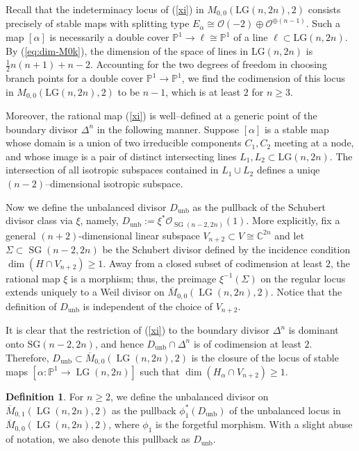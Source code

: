 \documentclass[10pt]{amsart}
\theoremstyle{definition}
\newtheorem{definition}[theorem]{Definition}
\newcommand{\Mbar}{\overline{M}}
\newcommand{\OO}{\mathcal{O}}
\newcommand{\LG}{\operatorname{LG}}
\DeclareMathOperator{\unb}{unb}
\newcommand{\PP}{\mathbb{P}}
\theoremstyle{plain} %
\begin{document}
Recall that the indeterminacy locus of (\ref{xi}) in $M_{0,0}(\mathrm{LG}(n,2n),2)$ consists precisely of stable maps with splitting type $E_\alpha \cong \mathcal{O}(-2) \oplus \mathcal{O}^{\oplus (n-1)}$. Such a map $[\alpha]$ is necessarily a double cover $\mathbb{P}^1 \to \ell \cong \mathbb{P}^1$ of a line $\ell \subset \mathrm{LG}(n,2n)$.
By (\ref{eq:dim-M0k}), the dimension of the space of lines in $\mathrm{LG}(n,2n)$ is $\frac{1}{2}n(n+1)+n-2$. Accounting for the two degrees of freedom in choosing branch points for a double cover $\mathbb{P}^1 \to \mathbb{P}^1$, we find the codimension of this locus in $M_{0,0}(\mathrm{LG}(n,2n),2)$ to be $n-1$, which is at least $2$ for $n \geq 3$.

Moreover, the rational map (\ref{xi}) is well--defined at a generic point of the boundary divisor $\Delta^n$ in the following manner. 
Suppose $[\alpha]$ is a stable map whose domain is a union of two irreducible components $C_1, C_2$ meeting at a node, and whose image is a pair of distinct intersecting lines $L_1, L_2 \subset \mathrm{LG}(n,2n)$.
The intersection of all isotropic subspaces contained in $L_1 \cup L_2$ defines a uniqe $(n-2)$--dimensional isotropic subspace. 

Now we define the unbalanced divisor \(D_{\mathrm{unb}}\) as the pullback of the Schubert divisor class via \(\xi\), namely,
$D_{\mathrm{unb}} := \xi^* \OO_{\operatorname{SG}(n-2,2n)}(1)$.
More explicitly, fix a general \((n+2)\)-dimensional linear subspace \(V_{n+2} \subset V\cong \mathbb C^{2n}\) and let \(\Sigma \subset \operatorname{SG}(n-2,2n)\) be the Schubert divisor defined by the incidence condition \(\dim( H \cap V_{n+2}) \geq1\).  
Away from a closed subset of codimension at least \(2\), the rational map \(\xi\) is a morphism; thus, the preimage \(\xi^{-1}(\Sigma)\) on the regular locus extends uniquely to a Weil divisor on \(\Mbar_{0,0}(\LG(n,2n),2)\).  Notice that the definition of $D_{\mathrm{unb}}$ is independent of the choice of $V_{n+2}$.


It is clear that the restriction of (\ref{xi}) to the boundary divisor $\Delta^n$ is dominant onto $\mathrm{SG}(n-2,2n)$, and hence $D_{\mathrm{unb}}\cap\Delta^n$ is of codimension at least $2$. Therefore, \(D_{\mathrm{unb}} \subset \Mbar_{0,0}(\LG(n,2n),2)\) is the closure of the locus of stable maps \([\alpha \colon \PP^1 \to \LG(n,2n)]\) such that \(\dim(H_\alpha\cap V_{n+2})\geq1\).


\begin{definition}\label{def:Dunb-pointed}
For \(n\ge 2\), we define the unbalanced divisor on $\overline{M}_{0,1}(\LG(n,2n),2)$ as the pullback $\phi_1^*(D_{\unb})$ of the unbalanced locus in $\overline{M}_{0,0}(\LG(n,2n),2)$, where $\phi_1$ is the forgetful morphism. With a slight abuse of notation, we also denote this pullback as $D_{\unb}$.
\end{definition}
\end{document}
